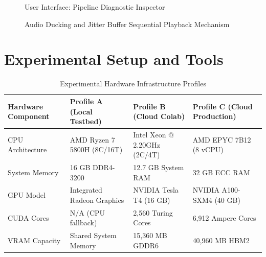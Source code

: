 \documentclass[12pt,a4paper]{report}
\begin{document}
\begin{figure}[H]
  \centering
  \caption{User Interface: Pipeline Diagnostic Inspector}
  \label{fig:fig4_15}
\end{figure}

\begin{figure}[H]
  \centering
  \caption{Audio Ducking and Jitter Buffer Sequential Playback Mechanism}
  \label{fig:fig4_16}
\end{figure}

\section{Experimental Setup and Tools}
\begin{table}[H]
\centering
\small
\caption{Experimental Hardware Infrastructure Profiles}
\label{tab:hw_profiles}
\begin{tabularx}{\textwidth}{lXXX}
\toprule
\textbf{Hardware Component} & \textbf{Profile A (Local Testbed)} & \textbf{Profile B (Cloud Colab)} & \textbf{Profile C (Cloud Production)} \\
\midrule
CPU Architecture & AMD Ryzen 7 5800H (8C/16T) & Intel Xeon @ 2.20GHz (2C/4T) & AMD EPYC 7B12 (8 vCPU) \\
System Memory & 16 GB DDR4-3200 & 12.7 GB System RAM & 32 GB ECC RAM \\
GPU Model & Integrated Radeon Graphics & NVIDIA Tesla T4 (16 GB) & NVIDIA A100-SXM4 (40 GB) \\
CUDA Cores & N/A (CPU fallback) & 2,560 Turing Cores & 6,912 Ampere Cores \\
VRAM Capacity & Shared System Memory & 15,360 MB GDDR6 & 40,960 MB HBM2 \\
\bottomrule
\end{tabularx}
\end{table}
\end{document}
